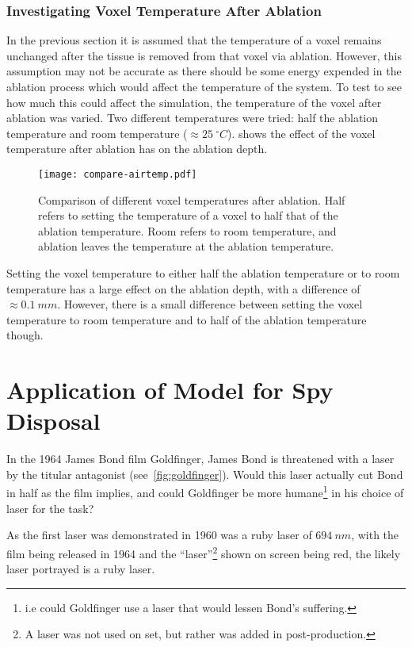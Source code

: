\subsubsection*{Investigating Voxel Temperature After Ablation}

In the previous section it is assumed that the temperature of a voxel remains unchanged after the tissue is removed from that voxel via ablation.
However, this assumption may not be accurate as there should be some energy expended in the ablation process which would affect the temperature of the system.
To test to see how much this could affect the simulation, the temperature of the voxel after ablation was varied.
Two different temperatures were tried: half the ablation temperature and room temperature ($\approx 25~^{\circ}C$).
 shows the effect of the voxel temperature after ablation has on the ablation depth.

\begin{figure}[!htbp]
	\centering
	\texttt{[image: compare-airtemp.pdf]}
	\caption{Comparison of different voxel temperatures after ablation. Half refers to setting the temperature of a voxel to half that of the ablation temperature. Room refers to room temperature, and ablation leaves the temperature at the ablation temperature.}
	\label{fig:comparevoxtemp}
\end{figure}

Setting the voxel temperature to either half the ablation temperature or to room temperature has a large effect on the ablation depth, with a difference of $\approx 0.1~mm$.
However, there is a small difference between setting the voxel temperature to room temperature and to half of the ablation temperature though.

\section{Application of Model for Spy Disposal}

In the 1964 James Bond film Goldfinger, James Bond is threatened with a laser by the titular antagonist (see~\cref{fig:goldfinger}).
Would this laser actually cut Bond in half as the film implies, and could Goldfinger be more humane\footnote{i.e could Goldfinger use a laser that would lessen Bond's suffering.} in his choice of laser for the task?

As the first laser was demonstrated in 1960 was a ruby laser of $694~nm$, with the film being released in 1964 and the ``laser''\footnote{A laser was not used on set, but rather was added in post-production.} shown on screen being red, the likely laser portrayed is a ruby laser.

